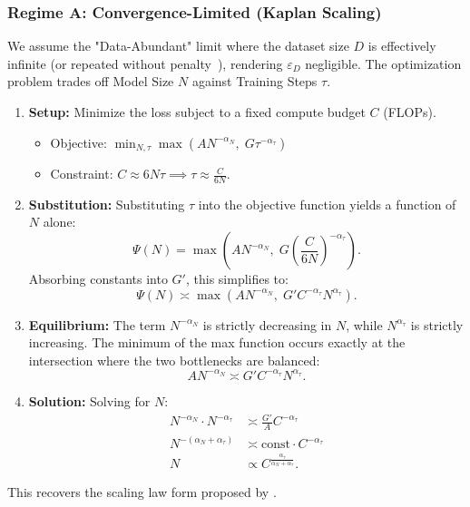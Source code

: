 \documentclass{article}
\theoremstyle{plain}
\theoremstyle{definition}
\theoremstyle{remark}
\begin{document}
\subsubsection{Regime A: Convergence-Limited (Kaplan Scaling)}
\label{subapp:kaplan_derivation}

We assume the "Data-Abundant" limit where the dataset size $D$ is effectively infinite (or repeated without penalty~\citep{yan2025largerdatasetsrepeatedmore}), rendering $\varepsilon_D$ negligible. The optimization problem trades off Model Size $N$ against Training Steps $\tau$.

\begin{enumerate}
    \item \textbf{Setup:} Minimize the loss subject to a fixed compute budget $C$ (FLOPs).
    \begin{itemize}
        \item Objective: $\min_{N, \tau} \max\left( A N^{-\alpha_N}, \; G \tau^{-\alpha_\tau} \right)$
        \item Constraint: $C \approx 6 N \tau \implies \tau \approx \frac{C}{6N}$.
    \end{itemize}

    \item \textbf{Substitution:} Substituting $\tau$ into the objective function yields a function of $N$ alone:
    \begin{equation*}
        \Psi(N) = \max\left( A N^{-\alpha_N}, \; G \left( \frac{C}{6N} \right)^{-\alpha_\tau} \right).
    \end{equation*}
    Absorbing constants into $G'$, this simplifies to:
    \begin{equation*}
        \Psi(N) \asymp \max\left( A N^{-\alpha_N}, \; G' C^{-\alpha_\tau} N^{\alpha_\tau} \right).
    \end{equation*}

    \item \textbf{Equilibrium:} The term $N^{-\alpha_N}$ is strictly decreasing in $N$, while $N^{\alpha_\tau}$ is strictly increasing. The minimum of the max function occurs exactly at the intersection where the two bottlenecks are balanced:
    \begin{equation*}
        A N^{-\alpha_N} \asymp G' C^{-\alpha_\tau} N^{\alpha_\tau}.
    \end{equation*}

    \item \textbf{Solution:} Solving for $N$:
    \begin{align*}
        N^{-\alpha_N} \cdot N^{-\alpha_\tau} &\asymp \frac{G'}{A} C^{-\alpha_\tau} \\
        N^{-(\alpha_N + \alpha_\tau)} &\asymp \text{const} \cdot C^{-\alpha_\tau} \\
        N &\propto C^{\frac{\alpha_\tau}{\alpha_N + \alpha_\tau}}.
    \end{align*}
\end{enumerate}
This recovers the scaling law form proposed by \citet{kaplan2020scalinglawsneurallanguage}.
\end{document}
